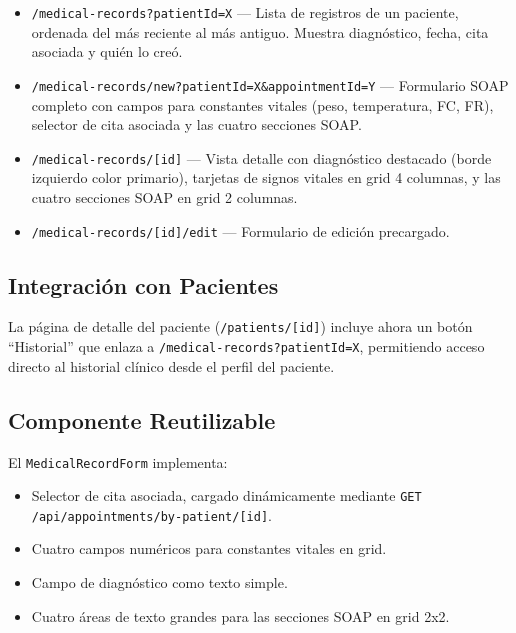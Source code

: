 \documentclass[12pt,a4paper]{article}
\begin{document}
\begin{itemize}[leftmargin=*]
    \item \texttt{/medical-records?patientId=X} --- Lista de registros de un
          paciente, ordenada del más reciente al más antiguo. Muestra
          diagnóstico, fecha, cita asociada y quién lo creó.
    \item \texttt{/medical-records/new?patientId=X\&appointmentId=Y} ---
          Formulario SOAP completo con campos para constantes vitales
          (peso, temperatura, FC, FR), selector de cita asociada y las
          cuatro secciones SOAP.
    \item \texttt{/medical-records/[id]} --- Vista detalle con diagnóstico
          destacado (borde izquierdo color primario), tarjetas de signos
          vitales en grid 4 columnas, y las cuatro secciones SOAP en grid
          2 columnas.
    \item \texttt{/medical-records/[id]/edit} --- Formulario de edición
          precargado.
\end{itemize}

\subsection{Integración con Pacientes}

La página de detalle del paciente (\texttt{/patients/[id]}) incluye ahora un
botón ``Historial'' que enlaza a
\texttt{/medical-records?patientId=X}, permitiendo acceso directo al
historial clínico desde el perfil del paciente.

\subsection{Componente Reutilizable}

El \texttt{MedicalRecordForm} implementa:

\begin{itemize}[leftmargin=*]
    \item Selector de cita asociada, cargado dinámicamente mediante
          \texttt{GET /api/appointments/by-patient/[id]}.
    \item Cuatro campos numéricos para constantes vitales en grid.
    \item Campo de diagnóstico como texto simple.
    \item Cuatro áreas de texto grandes para las secciones SOAP en grid
          2x2.
\end{itemize}
\end{document}
